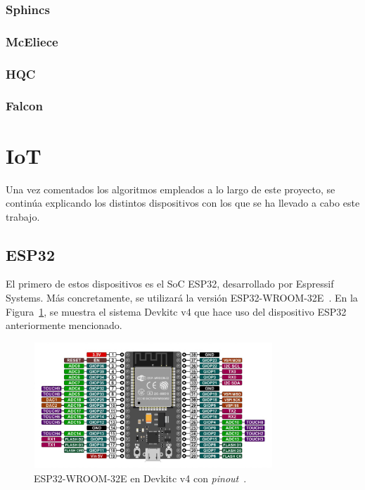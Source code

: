 \subsubsection{Sphincs}\label{subsubsec:sphincs}

\subsubsection{McEliece}\label{subsubsec:mceliece}

\subsubsection{HQC}\label{subsubsec:hqc}

\subsubsection{Falcon}\label{subsubsec:falcon}




\section{IoT}\label{sec:iot}

Una vez comentados los algoritmos empleados a lo largo de este proyecto, se continúa explicando los distintos dispositivos con los que se ha llevado a cabo este trabajo.

\subsection{ESP32}\label{subsec:esp32}

El primero de estos dispositivos es el \ac{SoC} ESP32, desarrollado por Espressif Systems.
Más concretamente, se utilizará la versión ESP32-WROOM-32E~\cite{esp32-spec}.
En la Figura~\ref{fig:esp32-pinout}, se muestra el sistema Devkitc v4 que hace uso del dispositivo ESP32 anteriormente mencionado.

\begin{figure}[h]
    \centering
    \includegraphics[width=0.8\textwidth]{figures/esp32-pinout.jpg}
    \caption{ESP32-WROOM-32E en Devkitc v4 con \textit{pinout}~\cite{esp32-pinout}.}
    \label{fig:esp32-pinout}
\end{figure}

